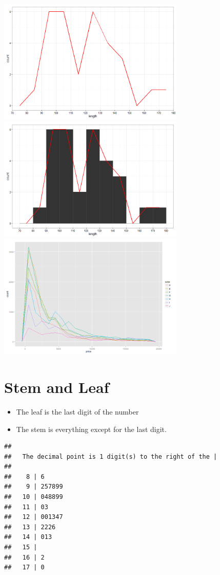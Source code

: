 \documentclass[12pt]{article}
\begin{document}
\includegraphics[width=3.5in]{figure/freqpoly-1.png}
\includegraphics[width=3.5in]{figure/freqpoly-2.png} \\
\includegraphics[width=3.5in]{figure/freqpoly-3.png}

\section{Stem and Leaf}\label{stem-and-leaf}

\begin{itemize}
\itemsep1pt\parskip0pt
\item
  The leaf is the last digit of the number
\item
  The stem is everything except for the last digit.
\end{itemize}

\begin{verbatim}
## 
##   The decimal point is 1 digit(s) to the right of the |
## 
##    8 | 6
##    9 | 257899
##   10 | 048899
##   11 | 03
##   12 | 001347
##   13 | 2226
##   14 | 013
##   15 | 
##   16 | 2
##   17 | 0
\end{verbatim}
\end{document}
